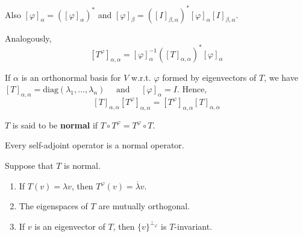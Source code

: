 Also $[\varphi]_\alpha = ([\varphi]_\alpha)^\ast$ and $[\varphi]_\beta = ([I]_{\beta, \alpha})^\ast [\varphi]_\alpha [I]_{\beta, \alpha}$.

Analogously,
\[ [T^\varphi]_{\alpha, \alpha} = [\varphi]_\alpha^{-1} ([T]_{\alpha, \alpha})^\ast [\varphi]_\alpha \]

If $\alpha$ is an orthonormal basis for $V$ w.r.t. $\varphi$ formed by eigenvectors of $T$, we have $[T]_{\alpha, \alpha} = \text{diag}(\lambda_1, \ldots, \lambda_n) \quad \text{ and } \quad [\varphi]_\alpha = I$. Hence, 
\[
  [T]_{\alpha, \alpha} [T^\varphi]_{\alpha, \alpha} = [T^\varphi]_{\alpha, \alpha} [T]_{\alpha, \alpha}
\]

\begin{definition}
  $T$ is said to be \textbf{normal} if $T \circ T^\varphi = T^\varphi \circ T$.
\end{definition}

Every self-adjoint operator is a normal operator. 

\begin{lemma}\label{lm:202301051341}
  Suppose that $T$ is normal.
  \begin{enumerate}
    \item If $T(v) = \lambda v$, then $T^\varphi(v) = \overline{\lambda} v$. 
    \item The eigenspaces of $T$ are mutually orthogonal. 
    \item If $v$ is an eigenvector of $T$, then $\{ v \}^{\perp_\varphi}$ is $T$-invariant. 
  \end{enumerate}
\end{lemma}


